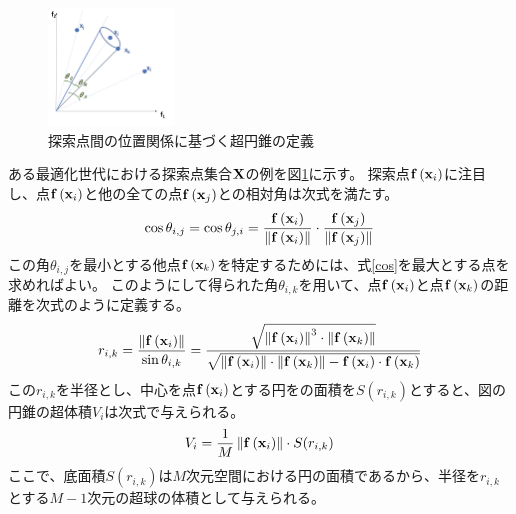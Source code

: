\documentclass{rentai-chugoku}
\begin{document}
\begin{figure}[b]
\begin{center}
\includegraphics[width=0.3\textwidth]{hv.png}
\end{center}
\label{hypercone}
\caption{
探索点間の位置関係に基づく超円錐の定義
}
\end{figure}
ある最適化世代における探索点集合${\bf X}$の例を図\ref{hypercone}に示す。
探索点${\bf f}\left( {\bf x}_i \right)$に注目し、点${\bf f}\left( {\bf x}_i \right)$と他の全ての点${\bf f}\left( {\bf x}_j \right)$との相対角は次式を満たす。
\begin{equation}
\cos \theta_{i,j} = \cos \theta_{j,i} = 
\frac{ {\bf f}\left( {\bf x}_i \right) }{\left\| {\bf f}\left( {\bf x}_i \right) \right\|}
\cdot
\frac{ {\bf f}\left( {\bf x}_j \right) }{\left\| {\bf f}\left( {\bf x}_j \right) \right\|}
\label{cos}
\end{equation}
この角$\theta_{i,j}$を最小とする他点${\bf f}\left( {\bf x}_k \right)$を特定するためには、式\ref{cos}を最大とする点を求めればよい。
このようにして得られた角$\theta_{i,k}$を用いて、点${\bf f}\left( {\bf x}_i \right)$と点${\bf f}\left( {\bf x}_k \right)$の距離を次式のように定義する。
\begin{equation}
r_{i,k} = \frac{ \left\| {\bf f}\left( {\bf x}_i \right) \right\| }
{ \sin \theta_{i,k}}
= \frac{\sqrt{ \left\| {\bf f}\left( {\bf x}_i \right) \right\|^3\cdot \left\| {\bf f}\left( {\bf x}_k \right) \right\| }}
{\sqrt{ \left\| {\bf f}\left( {\bf x}_i \right) \right\|\cdot \left\| {\bf f}\left( {\bf x}_k \right) \right\| - {\bf f}\left( {\bf x}_i \right)\cdot {\bf f}\left( {\bf x}_k \right)}}
\end{equation}
この$r_{i,k}$を半径とし、中心を点${\bf f}\left( {\bf x}_i \right)$とする円をの面積を$S(r_{i,k})$とすると、図の円錐の超体積$V_i$は次式で与えられる。
\begin{equation}
V_i = \frac{1}{M} \left\| {\bf f}\left( {\bf x}_i \right) \right\| \cdot S(r_{i,k})
\end{equation}
ここで、底面積$S(r_{i,k})$は$M$次元空間における円の面積であるから、半径を$r_{i,k}$とする$M-1$次元の超球の体積として与えられる。
\end{document}
